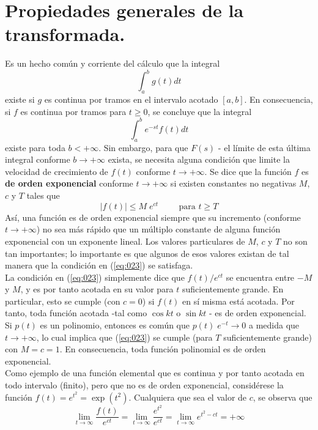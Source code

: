 \section{Propiedades generales de la transformada.}
Es un hecho común y corriente del cálculo que la integral
\[\int_{a}^{b} g(t) dt \]
existe si $g$ es continua por tramos en el intervalo acotado $[a, b]$. En consecuencia, si $f$ es continua por tramos para $t \geq 0$, se concluye que la integral
\[ \int_{a}^{b} e^{-st} f(t) dt \]
existe para toda $b < + \infty$. Sin embargo, para que $F(s)$  - el límite de esta última integral conforme $b \to + \infty$ exista, se necesita alguna condición que limite la velocidad de crecimiento de $f(t)$ conforme $t \to + \infty$. Se dice que la función $f$ es \textbf{de orden exponencial} conforme $t \to + \infty$ si existen constantes no negativas $M$, $c$ y $T$ tales que
\begin{equation}
\vert f(t) \vert \leq M \; e^{ct} \hspace{1cm} \mbox{para } t \geq T
\label{eq:023}
\end{equation}
Así, una función es de orden exponencial siempre que su incremento (conforme $t \to + \infty$) no sea más rápido que un múltiplo constante de alguna función exponencial con un exponente lineal. Los valores particulares de $M$, $c$ y $T$ no son tan importantes; lo importante es que algunos de esos valores existan de tal manera que la condición en (\ref{eq:023}) se satisfaga.
\\
La condición en (\ref{eq:023}) simplemente dice que $f(t) / e^{ct}$ se encuentra entre $-M$ y $M$, y es por tanto acotada en su valor para $t$ suficientemente grande. En particular, esto se cumple (con $c = 0$) si $f(t)$ en sí misma está acotada. Por tanto, toda función acotada -tal como $\cos kt$ o $\sin kt$ - es de orden exponencial.
\\
Si $p(t)$ es un polinomio, entonces es común que $p(t) \; e^{-t} \to 0$ a medida que $t \to +\infty$, lo cual implica que (\ref{eq:023}) se cumple (para $T$ suficientemente grande) con $M = c = 1$. En consecuencia, toda función polinomial es de orden exponencial.
\\
Como ejemplo de una función elemental que es continua y por tanto acotada en todo intervalo (finito), pero que no es de orden exponencial, considérese la función $f(t) = e^{t^{2}} = \exp(t^{2})$. Cualquiera que sea el valor de $c$, se observa que
\[ \lim_{t \to \infty} \dfrac{f(t)}{e^{ct}} = \lim_{t \to \infty} \dfrac{e^{t^{2}}}{e^{ct}} = \lim_{t \to \infty} e^{t^{2}-ct} = + \infty  \]
